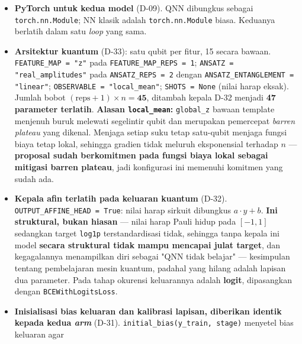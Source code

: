 \begin{itemize}
    \item \textbf{PyTorch untuk kedua model} (D-09). QNN dibungkus sebagai
          \texttt{torch.nn.Module}; NN klasik adalah \texttt{torch.nn.Module}
          biasa. Keduanya berlatih dalam satu \textit{loop} yang sama.
    \item \textbf{Arsitektur kuantum} (D-33): satu qubit per fitur, 15 secara
          bawaan. \texttt{FEATURE\_MAP = "z"} pada
          \texttt{FEATURE\_MAP\_REPS = 1}; \texttt{ANSATZ = "real\_amplitudes"}
          pada \texttt{ANSATZ\_REPS = 2} dengan
          \texttt{ANSATZ\_ENTANGLEMENT = "linear"};
          \texttt{OBSERVABLE = "local\_mean"}; \texttt{SHOTS = None} (nilai harap
          eksak). Jumlah bobot $(\text{reps}+1)\times n = \textbf{45}$, ditambah
          kepala D-32 menjadi \textbf{47 parameter terlatih}.
          \textbf{Alasan \texttt{local\_mean}:} \texttt{global\_z} bawaan
          template menjenuh buruk melewati segelintir qubit dan merupakan
          pemercepat \textit{barren plateau} yang dikenal. Menjaga setiap suku
          tetap satu-qubit menjaga fungsi biaya tetap lokal, sehingga gradien
          tidak meluruh eksponensial terhadap $n$ --- \textbf{proposal sudah
          berkomitmen pada fungsi biaya lokal sebagai mitigasi barren plateau},
          jadi konfigurasi ini memenuhi komitmen yang sudah ada.
    \item \textbf{Kepala afin terlatih pada keluaran kuantum} (D-32).
          \texttt{OUTPUT\_AFFINE\_HEAD = True}: nilai harap sirkuit dibungkus
          $a \cdot y + b$. \textbf{Ini struktural, bukan hiasan} --- nilai harap
          Pauli hidup pada $[-1,1]$ sedangkan target \texttt{log1p} terstandardisasi
          tidak, sehingga tanpa kepala ini model \textbf{secara struktural tidak
          mampu mencapai julat target}, dan kegagalannya menampilkan diri sebagai
          "QNN tidak belajar" --- kesimpulan tentang pembelajaran mesin kuantum,
          padahal yang hilang adalah lapisan dua parameter. Pada tahap okurensi
          keluarannya adalah \textbf{logit}, dipasangkan dengan
          \texttt{BCEWithLogitsLoss}.
    \item \textbf{Inisialisasi bias keluaran dan kalibrasi lapisan, diberikan
          identik kepada kedua \textit{arm}} (D-31).
          \texttt{initial\_bias(y\_train, stage)} menyetel bias keluaran agar

\end{itemize}
